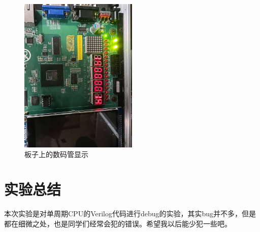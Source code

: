 \documentclass[UTF8]{article}
\begin{document}
\begin{figure}[H]
    \centering
    \includegraphics[width=0.5\textwidth]{board.png}
    \caption{板子上的数码管显示}
\end{figure}

\section{实验总结}

本次实验是对单周期CPU的Verilog代码进行debug的实验，其实bug并不多，但是都在细微之处，也是同学们经常会犯的错误。希望我以后能少犯一些吧。
\end{document}
